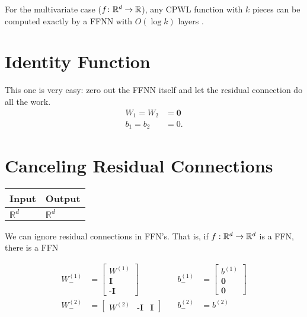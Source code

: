 For the multivariate case ($f \colon \mathbb{R}^d \to \mathbb{R}$), any CPWL function with $k$ pieces can be computed exactly by a FFNN with $O(\log k)$ layers \citep{arora+:2018}.

\section{Identity Function}

This one is very easy: zero out the FFNN itself and let the residual connection do all the work.
\begin{align*}
W_1 = W_2 &= \mathbf{0} \\ 
b_1 = b_2 &= 0.
\end{align*}

\section{Canceling Residual Connections}

    \begin{tabular}{|p{1.5cm}|p{1.5cm}|}
        \hline
        \rowcolor{orange!20} %
        \textbf{Input} & \textbf{Output} \\
        \hline
        $\mathbb{R}^d$ & $\mathbb{R}^d$ \\
        \hline
    \end{tabular}

    We can ignore residual connections in FFN's. That is, if $f:\mathbb{R}^d\to \mathbb{R}^d$ is a FFN, there is a FFN 

    \begin{align*}
        W_-^{(1)}&=\begin{bmatrix}
            W^{(1)}\\
            \textbf{I}\\
            \textbf{-I}
        \end{bmatrix}  &\quad b_-^{(1)}&=\begin{bmatrix}
            b^{(1)}\\
            \textbf{0}\\
            \textbf{0}
        \end{bmatrix}\\
        W_-^{(2)}&=\begin{bmatrix}
            W^{(2)}& \textbf{-I} & \textbf{I}
        \end{bmatrix}
        & \quad b_-^{(2)} &= b^{(2)}
    \end{align*}


